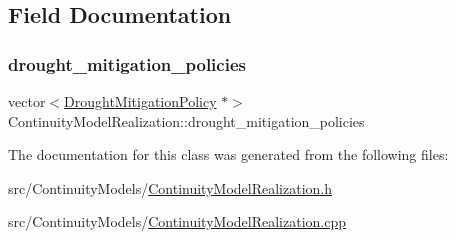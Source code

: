 \subsection{Field Documentation}
\mbox{\label{classContinuityModelRealization_a757dcf1de115c674fd5adcb040c5f277_a757dcf1de115c674fd5adcb040c5f277}} 
\subsubsection{\texorpdfstring{drought\+\_\+mitigation\+\_\+policies}{drought\_mitigation\_policies}}
{\footnotesize\ttfamily vector$<$\mbox{\hyperlink{classDroughtMitigationPolicy}{Drought\+Mitigation\+Policy}} $\ast$$>$ Continuity\+Model\+Realization\+::drought\+\_\+mitigation\+\_\+policies\hspace{0.3cm}{\ttfamily [private]}}



The documentation for this class was generated from the following files\+:\begin{DoxyCompactItemize}
\item 
src/\+Continuity\+Models/\mbox{\hyperlink{ContinuityModelRealization_8h}{Continuity\+Model\+Realization.\+h}}\item 
src/\+Continuity\+Models/\mbox{\hyperlink{ContinuityModelRealization_8cpp}{Continuity\+Model\+Realization.\+cpp}}\end{DoxyCompactItemize}
